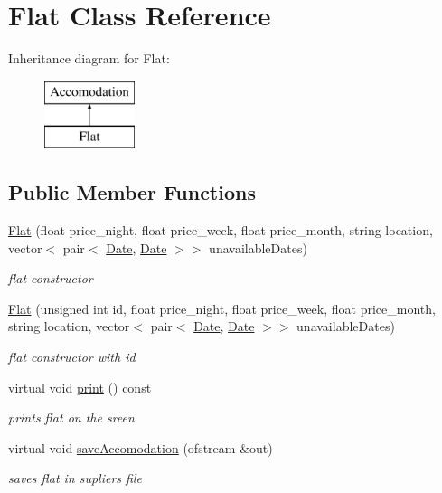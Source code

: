 \hypertarget{class_flat}{}\section{Flat Class Reference}
\label{class_flat}
Inheritance diagram for Flat\+:\begin{figure}[H]
\begin{center}
\leavevmode
\includegraphics[height=2.000000cm]{class_flat}
\end{center}
\end{figure}
\subsection*{Public Member Functions}
\begin{DoxyCompactItemize}
\item 
\hyperlink{class_flat_afa99056abbef313ebb20cdf4cc66bd14}{Flat} (float price\+\_\+night, float price\+\_\+week, float price\+\_\+month, string location, vector$<$ pair$<$ \hyperlink{class_date}{Date}, \hyperlink{class_date}{Date} $>$$>$ unavailable\+Dates)
\begin{DoxyCompactList}\small\item\em flat constructor \end{DoxyCompactList}\item 
\hyperlink{class_flat_a9ae64f076ea0fd8d191cedb5bda50e39}{Flat} (unsigned int id, float price\+\_\+night, float price\+\_\+week, float price\+\_\+month, string location, vector$<$ pair$<$ \hyperlink{class_date}{Date}, \hyperlink{class_date}{Date} $>$$>$ unavailable\+Dates)
\begin{DoxyCompactList}\small\item\em flat constructor with id \end{DoxyCompactList}\item 
\hypertarget{class_flat_a9ba466cf178ef918f571145838d81173}{}\label{class_flat_a9ba466cf178ef918f571145838d81173} 
virtual void \hyperlink{class_flat_a9ba466cf178ef918f571145838d81173}{print} () const
\begin{DoxyCompactList}\small\item\em prints flat on the sreen \end{DoxyCompactList}\item 
virtual void \hyperlink{class_flat_a9569fe297d02edebfe67d62125a86696}{save\+Accomodation} (ofstream \&out)
\begin{DoxyCompactList}\small\item\em saves flat in supliers file \end{DoxyCompactList}\end{DoxyCompactItemize}

